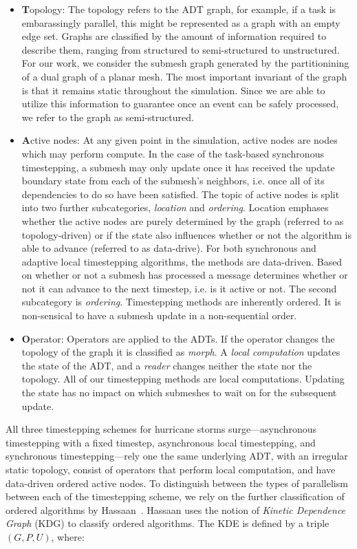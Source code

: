 \begin{itemize}
\item {\bf T}opology: The topology refers to the ADT graph, for example, if a task is embarassingly parallel, this might be represented as a graph with an empty edge set. Graphs are classified by the amount of information required to describe them, ranging from structured to semi-structured to unstructured. For our work, we consider the submesh graph generated by the partitionining of a dual graph of a planar mesh. The most important invariant of the graph is that it remains static throughout the simulation. Since we are able to utilize this information to guarantee once an event can be safely processed, we refer to the graph as semi-structured.
\item {\bf A}ctive nodes: At any given point in the simulation, active nodes are nodes which may perform  compute. In the case of the task-based synchronous timestepping, a submesh may only update once it has received the update boundary state from each of the submesh's neighbors, i.e. once all of its dependencies to do so have been satisfied. The topic of active nodes is split into two further subcategories, {\em location} and {\em ordering}. Location emphases whether the active nodes are purely determined by the graph (referred to as topology-driven) or if the state also influences whether or not the algorithm is able to advance (referred to as data-drive). For both synchronous and adaptive local timestepping algorithms, the methods are data-driven. Based on whether or not a submesh has processed a message determines whether or not it can advance to the next timestep, i.e. is it active or not. The second subcategory is {\em ordering}. Timestepping methods are inherently ordered. It is non-sensical to have a submesh update in a non-sequential order.
\item {\bf O}perator: Operators are applied to the ADTs. If the operator changes the topology of the graph it is classified as {\em morph}. A {\em local computation} updates the state of the ADT, and a {\em reader} changes neither the state nor the topology. All of our timestepping methods are local computations. Updating the state has no impact on which submeshes to wait on for the subsequent update.
\end{itemize}
All three timestepping schemes for hurricane storms surge---asynchronous timestepping with a fixed timestep, asynchronous local timestepping, and synchronous timestepping---rely one the same underlying ADT, with an irregular static topology, consist of operators that perform local computation, and have data-driven ordered active nodes. To distinguish between the types of parallelism between each of the timestepping scheme, we rely on the further classification of ordered algorithms by Hassaan~\cite{Hassaan1, Hassaan2}. Hassaan uses the notion of {\em Kinetic Dependence Graph} (KDG) to classify ordered algorithms. The KDE is defined by a triple $(G,P,U)$, where:
